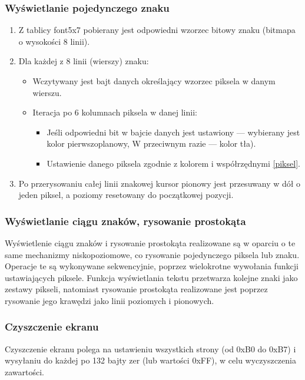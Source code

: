 \subsubsection{Wyświetlanie pojedynczego znaku}
\begin{enumerate}
    \item Z tablicy font5x7 pobierany jest odpowiedni wzorzec bitowy znaku (bitmapa o wysokości 8 linii).
    \item Dla każdej z 8 linii (wierszy) znaku:
    \begin{itemize}
        \item Wczytywany jest bajt danych określający wzorzec piksela w danym wierszu.
        \item Iteracja po 6 kolumnach piksela w danej linii:
        \begin{itemize}
            \item Jeśli odpowiedni bit w bajcie danych jest ustawiony — wybierany jest kolor pierwszoplanowy, W przeciwnym razie — kolor tła).
            \item Ustawienie danego piksela zgodnie z kolorem i współrzędnymi \ref{piksel}.
        \end{itemize}
    \end{itemize}
    \item Po przerysowaniu całej linii znakowej kursor pionowy jest przesuwany w dół o jeden piksel, a poziomy resetowany do początkowej pozycji.
\end{enumerate}

\subsubsection{Wyświetlanie ciągu znaków, rysowanie prostokąta}

Wyświetlenie ciągu znaków i rysowanie prostokąta realizowane są w oparciu o te same mechanizmy niskopoziomowe, co rysowanie pojedynczego piksela lub znaku. Operacje te są wykonywane sekwencyjnie, poprzez wielokrotne wywołania funkcji ustawiających piksele. Funkcja wyświetlania tekstu przetwarza kolejne znaki jako zestawy pikseli, natomiast rysowanie prostokąta realizowane jest poprzez rysowanie jego krawędzi jako linii poziomych i pionowych.

\subsubsection{Czyszczenie ekranu}
Czyszczenie ekranu polega na ustawieniu wszystkich strony (od 0xB0 do 0xB7) i wysyłaniu do każdej po 132 bajty zer (lub wartości 0xFF), w celu wyczyszczenia zawartości.

